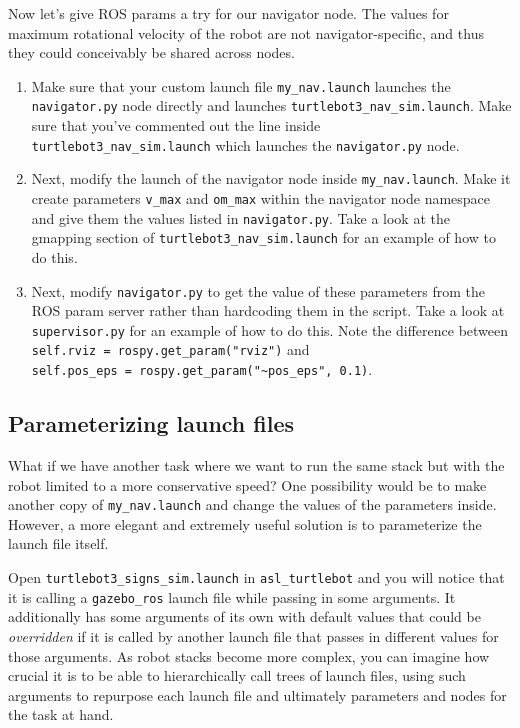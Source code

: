 \documentclass{article}
\begin{document}
Now let's give ROS params a try for our navigator node. The values for maximum rotational velocity of the robot are not navigator-specific, and thus they could conceivably be shared across nodes. 
\begin{enumerate}
    \item Make sure that your custom launch file \texttt{my\_nav.launch} launches the \texttt{navigator.py} node directly and launches \texttt{turtlebot3\_nav\_sim.launch}. Make sure that you've commented out the line inside \\ \texttt{turtlebot3\_nav\_sim.launch} which launches the \texttt{navigator.py} node.  
    \item Next, modify the launch of the navigator node inside \texttt{my\_nav.launch}. Make it create parameters \texttt{v\_max} and \texttt{om\_max} within the navigator node namespace and give them the values listed in \texttt{navigator.py}. Take a look at the gmapping section of \texttt{turtlebot3\_nav\_sim.launch} for an example of how to do this.
    \item Next, modify \texttt{navigator.py} to get the value of these parameters from the ROS param server rather than hardcoding them in the script. Take a look at \texttt{supervisor.py} for an example of how to do this. Note the difference between \lstinline{self.rviz = rospy.get_param("rviz")} and \\ \lstinline{self.pos_eps = rospy.get_param("~pos_eps", 0.1)}.
\end{enumerate}  

\subsection{Parameterizing launch files}
What if we have another task where we want to run the same stack but with the robot limited to a more conservative speed? One possibility would be to make another copy of \texttt{my\_nav.launch} and change the values of the parameters inside. However, a more elegant and extremely useful solution is to parameterize the launch file itself.

Open \texttt{turtlebot3\_signs\_sim.launch} in \texttt{asl\_turtlebot} and you will notice that it is calling a \texttt{gazebo\_ros} launch file while passing in some arguments. It additionally has some arguments of its own with default values that could be \textit{overridden} if it is called by another launch file that passes in different values for those arguments. As robot stacks become more complex, you can imagine how crucial it is to be able to hierarchically call trees of launch files, using such arguments to repurpose each launch file and ultimately parameters and nodes for the task at hand.
\end{document}
